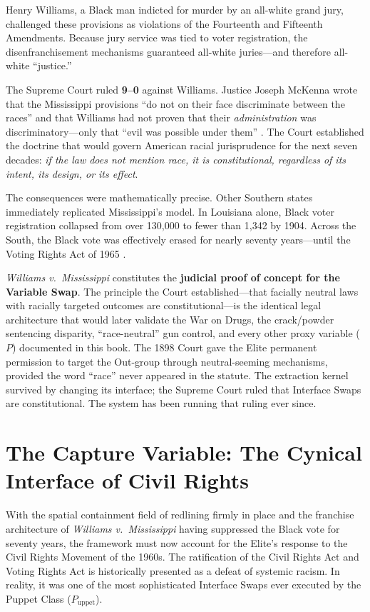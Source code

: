 Henry Williams, a Black man indicted for murder by an all-white grand jury, challenged these provisions as violations of the Fourteenth and Fifteenth Amendments. Because jury service was tied to voter registration, the disenfranchisement mechanisms guaranteed all-white juries---and therefore all-white ``justice.''

The Supreme Court ruled \textbf{9--0} against Williams. Justice Joseph McKenna wrote that the Mississippi provisions ``do not on their face discriminate between the races'' and that Williams had not proven that their \textit{administration} was discriminatory---only that ``evil was possible under them'' \cite{williams_v_miss}. The Court established the doctrine that would govern American racial jurisprudence for the next seven decades: \textit{if the law does not mention race, it is constitutional, regardless of its intent, its design, or its effect}.

The consequences were mathematically precise. Other Southern states immediately replicated Mississippi's model. In Louisiana alone, Black voter registration collapsed from over 130,000 to fewer than 1,342 by 1904. Across the South, the Black vote was effectively erased for nearly seventy years---until the Voting Rights Act of 1965 \cite{williams_v_miss}.

\textit{Williams v.\ Mississippi} constitutes the \textbf{judicial proof of concept for the Variable Swap}. The principle the Court established---that facially neutral laws with racially targeted outcomes are constitutional---is the identical legal architecture that would later validate the War on Drugs, the crack/powder sentencing disparity, ``race-neutral'' gun control, and every other proxy variable ($P$) documented in this book. The 1898 Court gave the Elite permanent permission to target the Out-group through neutral-seeming mechanisms, provided the word ``race'' never appeared in the statute. The extraction kernel survived by changing its interface; the Supreme Court ruled that Interface Swaps are constitutional. The system has been running that ruling ever since.

\section{The Capture Variable: The Cynical Interface of Civil Rights}

With the spatial containment field of redlining firmly in place and the franchise architecture of \textit{Williams v.\ Mississippi} having suppressed the Black vote for seventy years, the framework must now account for the Elite's response to the Civil Rights Movement of the 1960s. The ratification of the Civil Rights Act and Voting Rights Act is historically presented as a defeat of systemic racism. In reality, it was one of the most sophisticated Interface Swaps ever executed by the Puppet Class ($P_{\text{uppet}}$).

